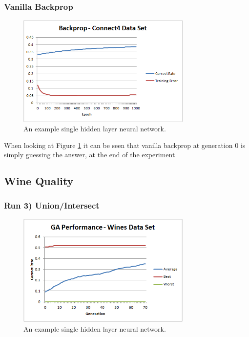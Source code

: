 \documentclass[journal]{IEEEtran}
\begin{document}
    \subsubsection*{Vanilla Backprop}
      \begin{figure}[here]%
        \centering
        \includegraphics[width=3.4in]{brain_connect4}
        \caption{An example single hidden layer neural network.}
        \label{fig:brain_connect4}
      \end{figure}
    
    When looking at Figure \ref{fig:brain_connect4} it can be seen that vanilla backprop
    at generation 0 is simply guessing the answer, at the end of the experiment 
      
  \subsection{Wine Quality}
    \subsubsection*{Run 3) Union/Intersect}
      \begin{figure}[here]%
        \centering
        \includegraphics[width=3.4in]{wine_performance_new}
        \caption{An example single hidden layer neural network.}
        \label{fig:wine_performace_new}
      \end{figure}
\end{document}
